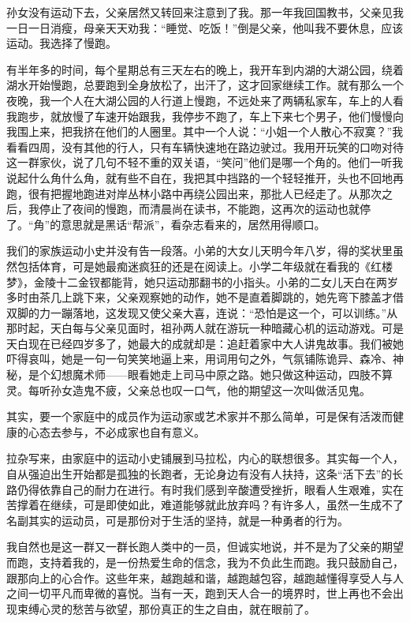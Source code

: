 \par 孙女没有运动下去，父亲居然又转回来注意到了我。那一年我回国教书，父亲见我一日一日消瘦，母亲天天劝我：“睡觉、吃饭！”倒是父亲，他叫我不要休息，应该运动。我选择了慢跑。
\par 有半年多的时间，每个星期总有三天左右的晚上，我开车到内湖的大湖公园，绕着湖水开始慢跑，总要跑到全身放松了，出汗了，这才回家继续工作。就有那么一个夜晚，我一个人在大湖公园的人行道上慢跑，不远处来了两辆私家车，车上的人看我跑步，就放慢了车速开始跟我，我停步不跑了，车上下来七个男子，他们慢慢向我围上来，把我挤在他们的人圈里。其中一个人说：“小姐一个人散心不寂寞？”我看看四周，没有其他的行人，只有车辆快速地在路边驶过。我用开玩笑的口吻对待这一群家伙，说了几句不轻不重的双关语，“笑问”他们是哪一个角的。他们一听我说起什么角什么角，就有些不自在，我把其中挡路的一个轻轻推开，头也不回地再跑，很有把握地跑进对岸丛林小路中再绕公园出来，那批人已经走了。从那次之后，我停止了夜间的慢跑，而清晨尚在读书，不能跑，这再次的运动也就停了。“角”的意思就是黑话“帮派”，看杂志看来的，居然用得顺口。
\par 我们的家族运动小史并没有告一段落。小弟的大女儿天明今年八岁，得的奖状里虽然包括体育，可是她最痴迷疯狂的还是在阅读上。小学二年级就在看我的《红楼梦》，金陵十二金钗都能背，她只运动那翻书的小指头。小弟的二女儿天白在两岁多时由茶几上跳下来，父亲观察她的动作，她不是直着脚跳的，她先弯下膝盖才借双脚的力一蹦落地，这发现又使父亲大喜，连说：“恐怕是这一个，可以训练。”从那时起，天白每与父亲见面时，祖孙两人就在游玩一种暗藏心机的运动游戏。可是天白现在已经四岁多了，她最大的成就却是：追赶着家中大人讲鬼故事。我们被她吓得哀叫，她是一句一句笑笑地逼上来，用词用句之外，气氛铺陈诡异、森冷、神秘，是个幻想魔术师——眼看她走上司马中原之路。她只做这种运动，四肢不算灵。每听孙女造鬼不疲，父亲总也叹一口气，他的期望这一次叫做活见鬼。
\par 其实，要一个家庭中的成员作为运动家或艺术家并不那么简单，可是保有活泼而健康的心态去参与，不必成家也自有意义。
\par 拉杂写来，由家庭中的运动小史铺展到马拉松，内心的联想很多。其实每一个人，自从强迫出生开始都是孤独的长跑者，无论身边有没有人扶持，这条“活下去”的长路仍得依靠自己的耐力在进行。有时我们感到辛酸遭受挫折，眼看人生艰难，实在苦撑着在继续，可是即使如此，难道能够就此放弃吗？有许多人，虽然一生成不了名副其实的运动员，可是那份对于生活的坚持，就是一种勇者的行为。
\par 我自然也是这一群又一群长跑人类中的一员，但诚实地说，并不是为了父亲的期望而跑，支持着我的，是一份热爱生命的信念，我为不负此生而跑。我只鼓励自己，跟那向上的心合作。这些年来，越跑越和谐，越跑越包容，越跑越懂得享受人与人之间一切平凡而卑微的喜悦。当有一天，跑到天人合一的境界时，世上再也不会出现束缚心灵的愁苦与欲望，那份真正的生之自由，就在眼前了。


